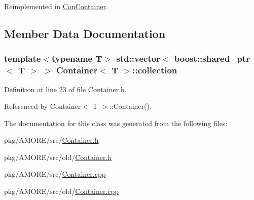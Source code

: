 Reimplemented in \hyperlink{class_con_container_aac12a3d3604db9ff715503816109470c}{ConContainer}.



\subsection{Member Data Documentation}
\hypertarget{class_container_a80e0663ccf6d358b15d0064d855a8e7b}{
\subsubsection[{collection}]{\setlength{\rightskip}{0pt plus 5cm}template$<$typename T$>$ std::vector$<$ boost::shared\_\-ptr$<$ T $>$ $>$ {\bf Container}$<$ T $>$::{\bf collection}}}
\label{class_container_a80e0663ccf6d358b15d0064d855a8e7b}


Definition at line 23 of file Container.h.



Referenced by Container$<$ T $>$::Container().



The documentation for this class was generated from the following files:\begin{DoxyCompactItemize}
\item 
pkg/AMORE/src/\hyperlink{_container_8h}{Container.h}\item 
pkg/AMORE/src/old/\hyperlink{old_2_container_8h}{Container.h}\item 
pkg/AMORE/src/\hyperlink{_container_8cpp}{Container.cpp}\item 
pkg/AMORE/src/old/\hyperlink{old_2_container_8cpp}{Container.cpp}\end{DoxyCompactItemize}
